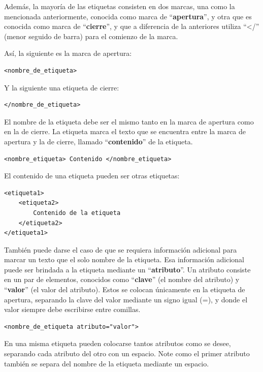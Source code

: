Además, la mayoría de las etiquetas consisten en dos marcas, una como la
mencionada anteriormente, conocida como marca de ``\textbf{apertura}'', y otra
que es conocida como marca de ``\textbf{cierre}'', y que a diferencia de la
anteriores utiliza ``</'' (menor seguido de barra) para el comienzo de la marca.

Así, la siguiente es la marca  de apertura:
\begin{lstlisting}[language=XHTML]
<nombre_de_etiqueta>
\end{lstlisting}

Y la siguiente una etiqueta de cierre:
\begin{lstlisting}[language=XHTML]
</nombre_de_etiqueta>
\end{lstlisting}

El nombre de la etiqueta debe ser el mismo tanto en la marca de apertura
como en la de cierre. La etiqueta marca el texto que se encuentra entre
la marca de apertura y la de cierre, llamado ``\textbf{contenido}'' de la etiqueta.

\begin{lstlisting}[language=XHTML]
<nombre_etiqueta> Contenido </nombre_etiqueta>
\end{lstlisting}

El contenido de una etiqueta pueden ser otras etiquetas:
\begin{lstlisting}[language=XHTML]
<etiqueta1>
    <etiqueta2>
        Contenido de la etiqueta
    </etiqueta2>
</etiqueta1>
\end{lstlisting}

También puede darse el caso de que se requiera información adicional para marcar
un texto que el solo nombre de la etiqueta. Esa información adicional puede
ser brindada a la etiqueta mediante un ``\textbf{atributo}''. Un atributo consiste en un
par de elementos, conocidos como ``\textbf{clave}'' (el nombre del atributo)
y ``\textbf{valor}'' (el valor del atributo). Estos se colocan únicamente en la
etiqueta de apertura, separando la clave del valor mediante un signo igual (=),
y donde el valor siempre debe escribirse entre comillas.

\begin{lstlisting}[language=XHTML]
<nombre_de_etiqueta atributo="valor">
\end{lstlisting}

En una misma etiqueta pueden colocarse tantos atributos como se desee, separando
cada atributo del otro con un espacio. Note como el primer atributo también
se separa del nombre de la etiqueta mediante un espacio.

